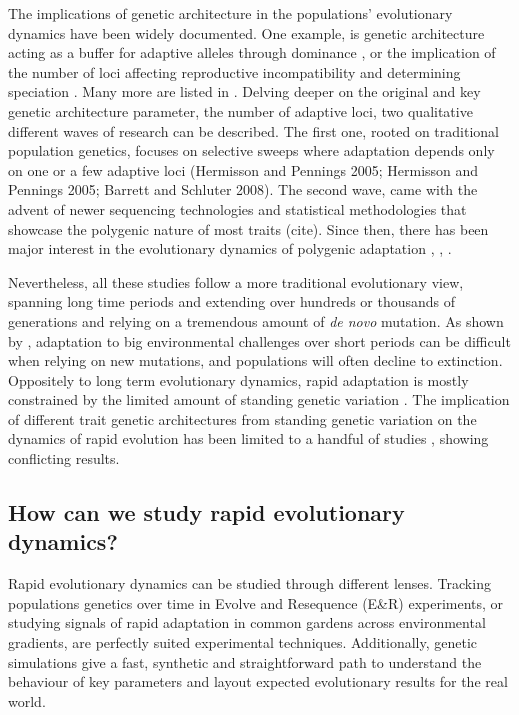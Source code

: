 \documentclass{article}
\begin{document}
The implications of genetic architecture in the populations' evolutionary dynamics have been widely documented. One example, is genetic architecture acting as a buffer for adaptive alleles through dominance \citep{Yamamichi2017-uj}, or the implication of the number of loci affecting reproductive incompatibility and determining speciation \citep{Orr1996-eq}. Many more are listed in \citep{Bertram2019-sg}. Delving deeper on the original and key genetic architecture parameter, the number of adaptive loci, two qualitative different waves of research can be described. The first one, rooted on traditional population genetics, focuses on selective sweeps where adaptation depends only on one or a few adaptive loci (Hermisson and Pennings 2005;  Hermisson and Pennings 2005; Barrett and Schluter 2008). The second wave, came with the advent of newer sequencing technologies and statistical methodologies that showcase the polygenic nature of most traits (cite). Since then, there has been major interest in the evolutionary dynamics of polygenic adaptation \citep{John2020-xc}  \citep{Jain2017-mb}, \citep{Barghi2020-aa} \citep{Hayward2021-ji, Stetter2018-st, Thornton2019-ww},  \citep{Hollinger2019-lb}. 

Nevertheless, all these studies follow a more traditional evolutionary view, spanning long time periods and extending over hundreds or thousands of generations and relying on a tremendous amount of \textit{de novo} mutation. As shown by \citep{Orr2008-jl}, adaptation to big environmental challenges over short periods can be difficult when relying on new mutations, and populations will often decline to extinction. Oppositely to long term evolutionary dynamics, rapid adaptation is mostly constrained by the limited amount of standing genetic variation \citep{Barrett2008-tj}. The implication of different trait genetic architectures from standing genetic variation on the dynamics of rapid evolution has been limited to a handful of studies \citep{Gomulkiewicz2010-wr, Kardos2021-jd}, showing conflicting results.

\subsection{How can we study rapid evolutionary dynamics? }
Rapid evolutionary dynamics can be studied through different lenses. Tracking populations genetics over time in Evolve and Resequence (E\&R) experiments, or studying signals of rapid adaptation in common gardens across environmental gradients, are perfectly suited experimental techniques. Additionally, genetic simulations give a fast, synthetic and straightforward path to understand the behaviour of key parameters and layout expected evolutionary results for the real world. 
\end{document}

